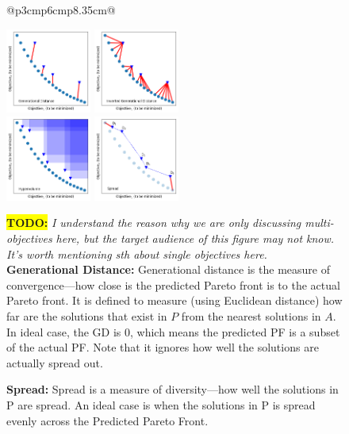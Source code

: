 \documentclass[sigconf,anonymous,review]{acmart}
\newcommand\TODO[1]{\textcolor{ScarletRed}{\textbf{\colorbox{yellow}{\small TODO:}} \emph{#1}}\xspace}
\begin{document}
\begin{figure}
{\begin{tabular}{@{}p{3cm}p{6cm}p{8.35cm}@{}}
{\begin{minipage}[b]{0.33\linewidth}
\includegraphics[height=2.8cm]{doc/tex/msr18/img/gd.png}
\includegraphics[height=2.8cm]{doc/tex/msr18/img/igd.png}\\
\includegraphics[height=2.8cm]{doc/tex/msr18/img/hv.png}
\includegraphics[height=2.8cm]{doc/tex/msr18/img/spread.png}

\end{minipage}	

\begin{minipage}[b]{0.67\linewidth}
\vspace{0.1cm}
\TODO{I understand the reason why we are only discussing multi-objectives here, but the target audience of this figure may not know. It's worth mentioning sth about single objectives here.}
\noindent\textbf{Generational Distance: } Generational distance is the measure of convergence---how close is the predicted Pareto front is to the actual Pareto front. It is defined to measure (using Euclidean distance) how far are the solutions that exist in $P$ from the nearest solutions in $A$. In ideal case, the GD is 0, which means the predicted PF is a subset of the actual PF. Note that it ignores how well the solutions are actually spread out.

\noindent\textbf{Spread: } Spread is a measure of diversity---how well the solutions in P are spread. An ideal case is when the solutions in P is spread evenly across the Predicted Pareto Front. 


\end{minipage}}
\end{tabular}}
\end{figure}
\end{document}
